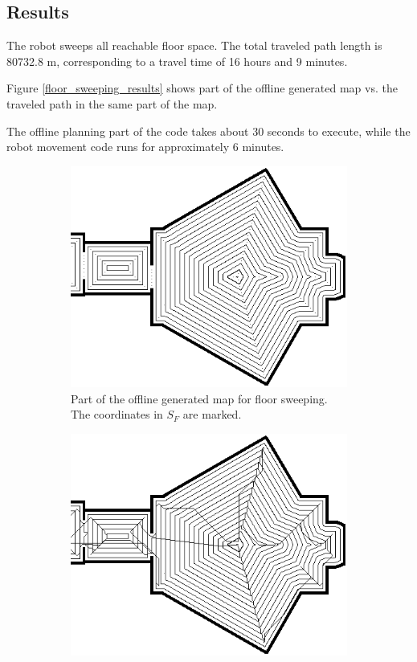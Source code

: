 \subsection{Results}
The robot sweeps all reachable floor space.
The total traveled path length is 80732.8 m, corresponding to a travel time of 16 hours and 9 minutes.

Figure \ref{floor_sweeping_results} shows part of the offline generated map vs. the traveled path in the same part of the map.

The offline planning part of the code takes about 30 seconds to execute,
while the robot movement code runs for approximately 6 minutes.

\begin{figure}[ht]
\centering
  \begin{subfigure}[t]{0.3\textwidth}
    \includegraphics[width = \textwidth]{graphics/floor_sweep_plan}
    \caption{Part of the offline generated map for floor sweeping. The coordinates in \(S_{F}\) are marked.}
    \label{floor_sweep_plan}
  \end{subfigure}
  \begin{subfigure}[t]{0.3\textwidth}
    \includegraphics[width = \textwidth]{graphics/floor_sweep_robot}

\end{subfigure}
\end{figure}
